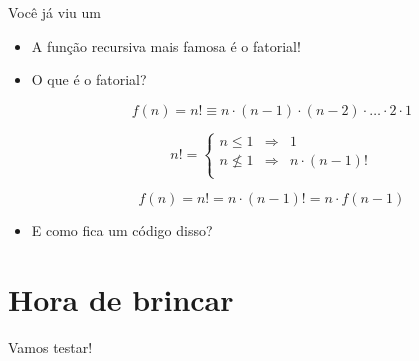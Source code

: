 \documentclass[14pt]{beamer}
\begin{document}
		\begin{frame}{Você já viu um}
			\begin{itemize}
				\presentationPause\item A função recursiva mais famosa é o fatorial!
				\presentationPause\item O que é o fatorial?
				
					\presentationPause\begin{equation}\label{equation.fatorial.1}
						f(n) = n! \equiv n\cdot(n-1)\cdot(n-2)\cdot {\dots} \cdot2\cdot1
					\end{equation}

					\presentationPause\begin{equation}\label{equation.fatorial.2}
						n! = \left\{
						\begin{array}{lcl}
							n\leq1&\Rightarrow&1\\
							n\nleq1&\Rightarrow&n\cdot(n-1)!\\
						\end{array}\right.
					\end{equation}

					\presentationPause\begin{equation}\label{equation.fatorial.3}
						f(n) = n! = n\cdot(n-1)! = n\cdot f(n-1)
					\end{equation}
				\presentationPause\item E como fica um código disso?
				\presentationPause
			\end{itemize}
		\end{frame}

	\section{Hora de brincar}
		\begin{frame}
			\begin{center}\Huge
				Vamos testar!
			\end{center}
		\end{frame}

	
\end{document}
